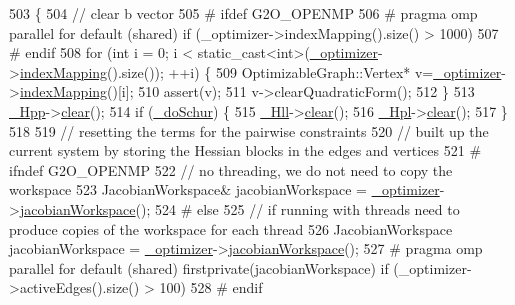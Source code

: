 \begin{DoxyCode}
503 \{
504   \textcolor{comment}{// clear b vector}
505 \textcolor{preprocessor}{# ifdef G2O\_OPENMP}
506 \textcolor{preprocessor}{# pragma omp parallel for default (shared) if (\_optimizer->indexMapping().size() > 1000)}
507 \textcolor{preprocessor}{# endif}
508   \textcolor{keywordflow}{for} (\textcolor{keywordtype}{int} i = 0; i < static\_cast<int>(\hyperlink{classg2o_1_1Solver_aff3275985d996329df15070348c21292}{\_optimizer}->\hyperlink{classg2o_1_1SparseOptimizer_a5e98a5f879f04c013b20f9c39a9057da}{indexMapping}().size()); ++i) \{
509     OptimizableGraph::Vertex* v=\hyperlink{classg2o_1_1Solver_aff3275985d996329df15070348c21292}{\_optimizer}->\hyperlink{classg2o_1_1SparseOptimizer_a5e98a5f879f04c013b20f9c39a9057da}{indexMapping}()[i];
510     assert(v);
511     v->clearQuadraticForm();
512   \}
513   \hyperlink{classg2o_1_1BlockSolver_ac222d4342825ed8632a87b4f5be94618}{\_Hpp}->\hyperlink{classg2o_1_1SparseBlockMatrix_af14b7aaa588b339f2c06793fcc0d4e09}{clear}();
514   \textcolor{keywordflow}{if} (\hyperlink{classg2o_1_1BlockSolver_ab375a5fac964182442f38288bd8a103a}{\_doSchur}) \{
515     \hyperlink{classg2o_1_1BlockSolver_a88d4c24df24a8fb72be1a4e4cff03d71}{\_Hll}->\hyperlink{classg2o_1_1SparseBlockMatrix_af14b7aaa588b339f2c06793fcc0d4e09}{clear}();
516     \hyperlink{classg2o_1_1BlockSolver_a0f6051339990e95aa587145a8a6f4f5f}{\_Hpl}->\hyperlink{classg2o_1_1SparseBlockMatrix_af14b7aaa588b339f2c06793fcc0d4e09}{clear}();
517   \}
518 
519   \textcolor{comment}{// resetting the terms for the pairwise constraints}
520   \textcolor{comment}{// built up the current system by storing the Hessian blocks in the edges and vertices}
521 \textcolor{preprocessor}{# ifndef G2O\_OPENMP}
522   \textcolor{comment}{// no threading, we do not need to copy the workspace}
523   JacobianWorkspace& jacobianWorkspace = \hyperlink{classg2o_1_1Solver_aff3275985d996329df15070348c21292}{\_optimizer}->\hyperlink{structg2o_1_1OptimizableGraph_aa669dbd1d6e34e49fecda711ff1b78c6}{jacobianWorkspace}();
524 \textcolor{preprocessor}{# else}
525   \textcolor{comment}{// if running with threads need to produce copies of the workspace for each thread}
526   JacobianWorkspace jacobianWorkspace = \hyperlink{classg2o_1_1Solver_aff3275985d996329df15070348c21292}{\_optimizer}->\hyperlink{structg2o_1_1OptimizableGraph_aa669dbd1d6e34e49fecda711ff1b78c6}{jacobianWorkspace}();
527 \textcolor{preprocessor}{# pragma omp parallel for default (shared) firstprivate(jacobianWorkspace) if
       (\_optimizer->activeEdges().size() > 100)}
528 \textcolor{preprocessor}{# endif}

\end{DoxyCode}
